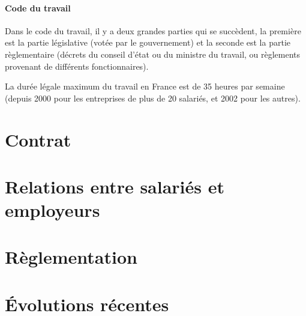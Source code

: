 \documentclass[a4paper,10pt,french,openany]{memoir}
\begin{document}
\paragraph{Code du travail}
Dans le code du travail, il y a deux grandes parties qui se succèdent, la première est la partie législative (votée par le gouvernement) et la seconde est la partie règlementaire (décrets du conseil d'état ou du ministre du travail, ou règlements provenant de différents fonctionnaires).

La durée légale maximum du travail en France est de 35 heures par semaine (depuis 2000 pour les entreprises de plus de 20 salariés, et 2002 pour les autres).

\section{Contrat}



\section{Relations entre salariés et employeurs}
\section{Règlementation}
\section{Évolutions récentes}
\end{document}
